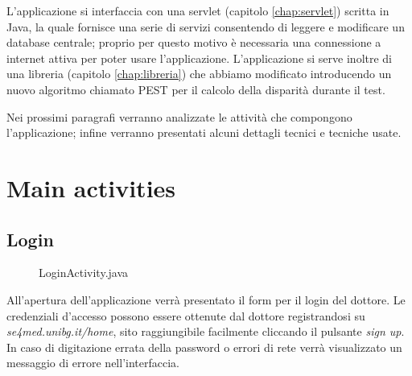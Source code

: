 \documentclass[
	corpo=12pt,
	twoside,
 	evenboxes,
	tipotesi=triennale,
    	stile=classica,
   	 greek,
]{toptesi}
\begin{document}
L'applicazione si interfaccia con una servlet (capitolo \ref{chap:servlet}) scritta in Java, la quale fornisce una serie di servizi consentendo di leggere e modificare un database centrale; proprio per questo motivo è necessaria una connessione a internet attiva per poter usare l'applicazione. 
L'applicazione si serve inoltre di una libreria (capitolo \ref{chap:libreria}) che abbiamo modificato introducendo un nuovo algoritmo chiamato PEST per il calcolo della disparità durante il test.

Nei prossimi paragrafi verranno analizzate le attività che compongono l'applicazione; infine verranno presentati alcuni dettagli tecnici e tecniche usate.

\newpage

\section{Main activities}
\label{sec:mainactivities}

\subsection{Login}
\label{subsec:login}
\begin{figure}[H]
\centering
{}
\caption{LoginActivity.java}
\label{fig:app_login}
\end{figure}
All'apertura dell'applicazione verrà presentato il form per il login del dottore. Le credenziali d'accesso possono essere ottenute dal dottore registrandosi su \textit{se4med.unibg.it/home}, sito raggiungibile facilmente cliccando il pulsante \textit{sign up}.
In caso di digitazione errata della password o errori di rete verrà visualizzato un messaggio di errore nell'interfaccia.
\end{document}
